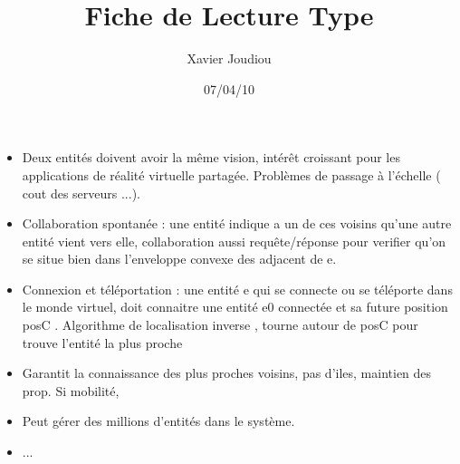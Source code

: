 \documentclass[11pt,a4paper]{article}
\title{Fiche de Lecture Type}
\author{Xavier Joudiou}
\date{07/04/10}
\begin{document}
	
  \begin{itemize}
  \renewcommand{\labelitemi}{$\Rightarrow$}
	\item Deux entités doivent avoir la même vision, intérêt croissant pour les applications de réalité virtuelle partagée. Problèmes de passage à l'échelle ( cout des serveurs ...).
	\item Collaboration spontanée : une entité indique a un de ces voisins qu'une autre entité vient vers elle, collaboration aussi requête/réponse pour verifier qu'on se situe bien dans l'enveloppe convexe des adjacent de e.
	\item Connexion et téléportation : une entité e qui se connecte ou se téléporte dans le monde virtuel, doit connaitre une entité e0 connectée et sa future position posC . Algorithme de localisation inverse , tourne autour de posC pour trouve l'entité la plus proche
	\item Garantit la connaissance des plus proches voisins, pas d'iles, maintien des prop. Si mobilité,
	\item Peut gérer des millions d'entités dans le système.
	\item ...
  \end{itemize}
\end{document}
